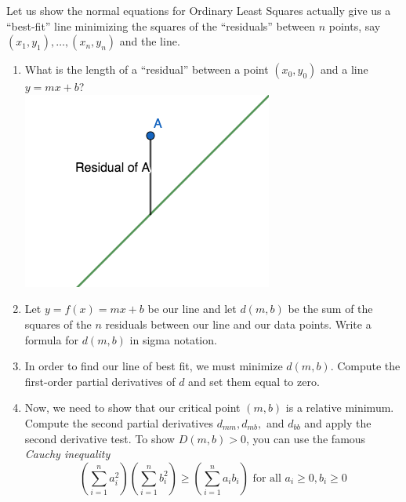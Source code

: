 \documentclass[12pt, a4paper]{article}
\begin{document}
\begin{ex}
  Let us show the normal equations for Ordinary Least Squares actually
  give us a ``best-fit'' line minimizing the squares of the
  ``residuals'' between 
  \(n\) points, say \((x_1,y_1), \ldots, (x_n, y_n)\) and the line.
  \begin{enumerate}
  \item What is the length of a ``residual'' between a point
    \((x_0,y_0)\) and a line 
    \(y=mx+b\)?\\
    \includegraphics[scale=0.5]{images/residual}
  \item Let \(y = f(x) = mx+b\) be our line and let \(d(m,b)\) be the
    sum of the squares of the \(n\) residuals between our line and our data
    points. Write a formula for \(d(m,b)\) in sigma notation.
    \vspace{1in}
  \item In order to find our line of best fit, we must minimize
    \(d(m,b)\). Compute the first-order partial derivatives of \(d\)
    and set them 
    equal to zero.
    \vspace{2in}
  \item Now, we need to show that our critical point \((m,b)\) is a relative
    minimum. Compute the second partial derivatives \(d_{mm}, d_{mb},\) and
    \(d_{bb}\) and apply the second derivative test. To show \(D(m,b)
    >0\), you can use the
    famous \emph{Cauchy inequality} \[
      \left( \sum_{i=1}^n a_i^2 \right) \left( \sum_{i=1}^n b_i^2 \right) \geq
      \left( \sum_{i=1}^n a_i b_i \right) \text{ for all } a_i \geq 0, b_i
      \geq 0
    \]
  \end{enumerate}
\end{ex}
\end{document}
